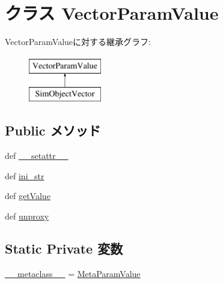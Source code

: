 \hypertarget{classm5_1_1params_1_1VectorParamValue}{
\section{クラス VectorParamValue}
\label{classm5_1_1params_1_1VectorParamValue}
}
VectorParamValueに対する継承グラフ:\begin{figure}[H]
\begin{center}
\leavevmode
\includegraphics[height=2cm]{classm5_1_1params_1_1VectorParamValue}
\end{center}
\end{figure}
\subsection*{Public メソッド}
\begin{DoxyCompactItemize}
\item 
def \hyperlink{classm5_1_1params_1_1VectorParamValue_a6287b7a16286568d5442b6e2e90215b5}{\_\-\_\-setattr\_\-\_\-}
\item 
def \hyperlink{classm5_1_1params_1_1VectorParamValue_a33ebe6cd32bcbd15465fc28b9d94bf82}{ini\_\-str}
\item 
def \hyperlink{classm5_1_1params_1_1VectorParamValue_acc340fbd4335fa34f9d57fb454b28ed0}{getValue}
\item 
def \hyperlink{classm5_1_1params_1_1VectorParamValue_a587cd3c1e899640dc09d63793aa8093b}{unproxy}
\end{DoxyCompactItemize}
\subsection*{Static Private 変数}
\begin{DoxyCompactItemize}
\item 
\hyperlink{classm5_1_1params_1_1VectorParamValue_adfc4d1824f4ecdcbb04ceafc5bbc933e}{\_\-\_\-metaclass\_\-\_\-} = \hyperlink{classm5_1_1params_1_1MetaParamValue}{MetaParamValue}
\end{DoxyCompactItemize}


